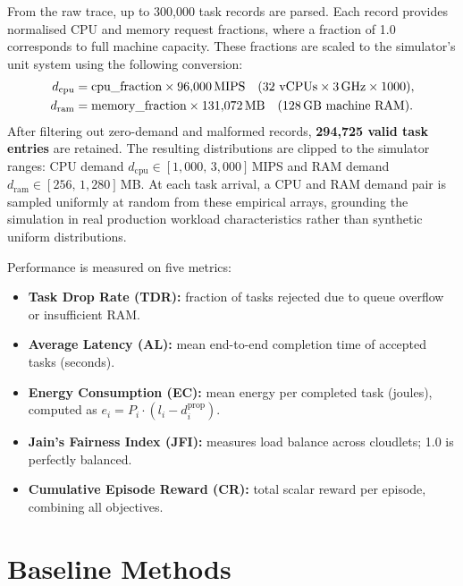 From the raw trace, up to 300,000 task records are parsed.
Each record provides normalised CPU and memory request
fractions, where a fraction of 1.0 corresponds to full
machine capacity. These fractions are scaled to the
simulator's unit system using the following conversion:
\begin{align}
  d_{\text{cpu}} &= \text{cpu\_fraction} \times 96{,}000\,\text{MIPS}
  \quad (\text{32 vCPUs} \times \text{3\,GHz} \times 1000), \\
  d_{\text{ram}} &= \text{memory\_fraction} \times 131{,}072\,\text{MB}
  \quad (\text{128\,GB machine RAM}).
\end{align}
After filtering out zero-demand and malformed records,
\textbf{294,725 valid task entries} are retained. The
resulting distributions are clipped to the simulator ranges:
CPU demand $d_{\text{cpu}} \in [1{,}000,\, 3{,}000]$\,MIPS
and RAM demand $d_{\text{ram}} \in [256,\, 1{,}280]$\,MB.
At each task arrival, a CPU and RAM demand pair is sampled
uniformly at random from these empirical arrays, grounding
the simulation in real production workload characteristics
rather than synthetic uniform distributions.

Performance is measured on five metrics:
\begin{itemize}
  \item \textbf{Task Drop Rate (TDR):} fraction of tasks
  rejected due to queue overflow or insufficient RAM.
  \item \textbf{Average Latency (AL):} mean end-to-end
  completion time of accepted tasks (seconds).
  \item \textbf{Energy Consumption (EC):} mean energy per
  completed task (joules), computed as
  $e_i = P_i \cdot (l_i - d_i^{\text{prop}})$.
  \item \textbf{Jain's Fairness Index (JFI):} measures load
  balance across cloudlets; 1.0 is perfectly balanced.
  \item \textbf{Cumulative Episode Reward (CR):} total scalar
  reward per episode, combining all objectives.
\end{itemize}

\section{Baseline Methods}
\label{sec:baselines}

